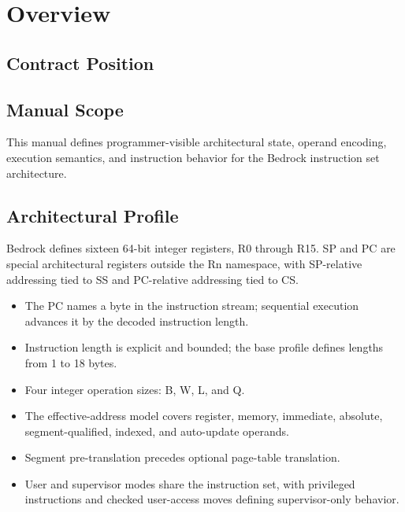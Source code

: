 \clearpage
\section{Overview}\label{page:overview}

\subsection{Contract Position}

\subsection{Manual Scope}
This manual defines programmer-visible architectural state, operand encoding, execution semantics,
and instruction behavior for the Bedrock instruction set architecture.

\Needspace{3.5in}
\subsection{Architectural Profile}
Bedrock defines sixteen 64-bit integer registers, R0 through R15. SP and PC are special architectural registers outside the
Rn namespace, with SP-relative addressing tied to SS and PC-relative addressing tied to CS.

\begin{itemize}
\item The PC names a byte in the instruction stream; sequential execution advances it by the decoded instruction length.
\item Instruction length is explicit and bounded; the base profile defines lengths from 1 to 18 bytes.
\item Four integer operation sizes: B, W, L, and Q.
\item The effective-address model covers register, memory, immediate, absolute, segment-qualified, indexed, and auto-update operands.
\item Segment pre-translation precedes optional page-table translation.
\item User and supervisor modes share the instruction set, with privileged instructions and checked user-access moves defining supervisor-only behavior.
\end{itemize}
